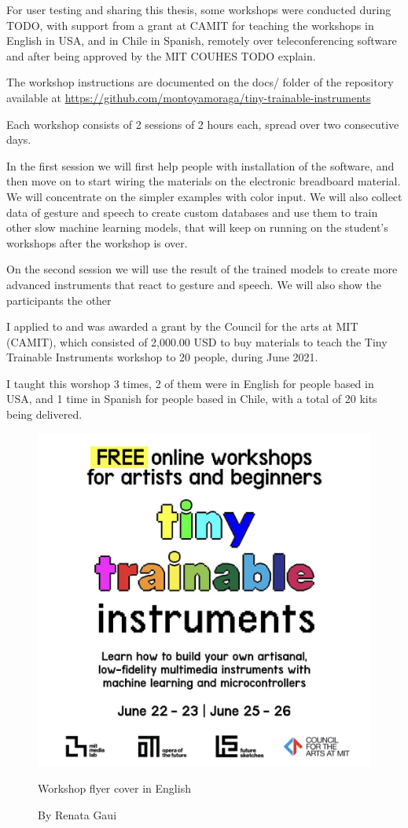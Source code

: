 For user testing and sharing this thesis, some workshops were conducted during TODO, with support from a grant at CAMIT for teaching the workshops in English in USA, and in Chile in Spanish, remotely over teleconferencing software and after being approved by the MIT COUHES TODO explain.

The workshop instructions are documented on the docs/ folder of the repository available at \url{https://github.com/montoyamoraga/tiny-trainable-instruments}

Each workshop consists of 2 sessions of 2 hours each, spread over two consecutive days.

In the first session we will first help people with installation of the software, and then move on to start wiring the materials on the electronic breadboard material. We will concentrate on the simpler examples with color input. We will also collect data of gesture and speech to create custom databases and use them to train other slow machine learning models, that will keep on running on the student's workshops after the workshop is over.

On the second session we will use the result of the trained models to create more advanced instruments that react to gesture and speech. We will also show the participants the other 

I applied to and was awarded a grant by the Council for the arts at MIT (CAMIT), which consisted of 2,000.00 USD to buy materials to teach the Tiny Trainable Instruments workshop to 20 people, during June 2021.

I taught this worshop 3 times, 2 of them were in English for people based in USA, and 1 time in Spanish for people based in Chile, with a total of 20 kits being delivered.

\begin{figure}[ht]
  \centering
  \includegraphics[width=0.75\linewidth,height=0.35\textheight,keepaspectratio]{images/workshop-en-1.jpg}
  \caption{Workshop flyer cover in English}
  \caption*{By Renata Gaui}
  \label{fig:workshop-english-flyer-page-1}
\end{figure}

